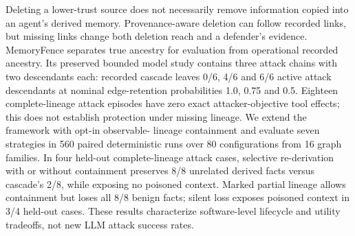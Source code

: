 Deleting a lower-trust source does not necessarily remove information copied into an agent's derived memory. Provenance-aware deletion can follow recorded links, but missing links change both deletion reach and a defender's evidence. MemoryFence separates true ancestry for evaluation from operational recorded ancestry. Its preserved bounded model study contains three attack chains with two descendants each: recorded cascade leaves 0/6, 4/6 and 6/6 active attack descendants at nominal edge-retention probabilities 1.0, 0.75 and 0.5. Eighteen complete-lineage attack episodes have zero exact attacker-objective tool effects; this does not establish protection under missing lineage. We extend the framework with opt-in observable- lineage containment and evaluate seven strategies in 560 paired deterministic runs over 80 configurations from 16 graph families. In four held-out complete-lineage attack cases, selective re-derivation with or without containment preserves 8/8 unrelated derived facts versus cascade's 2/8, while exposing no poisoned context. Marked partial lineage allows containment but loses all 8/8 benign facts; silent loss exposes poisoned context in 3/4 held-out cases. These results characterize software-level lifecycle and utility tradeoffs, not new LLM attack success rates.
